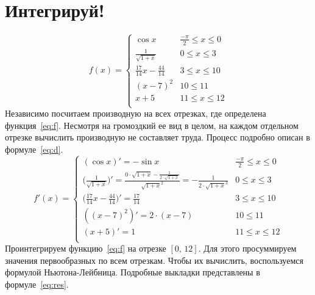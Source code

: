 \documentclass[30pt]{article}
\begin{document}
    \section{Интегрируй!}
        \begin{equation}
            f(x) = \begin{cases}
                \cos{x} & \frac{-\pi}{2} \leqslant x \leqslant 0 \\
                \frac{1}{\sqrt{1 + x}} & 0 \leqslant x \leqslant 3 \\
                \frac{17}{14}x - \frac{44}{14} & 3 \leqslant x \leqslant 10 \\
                (x - 7)^2 & 10 \leqslant  11 \\
                x + 5 & 11 \leqslant x \leqslant 12 \\
            \end{cases}
            \label{eq:f}
        \end{equation}
        Независимо посчитаем производную на всех отрезках, где определена функция~\eqref{eq:f}. Несмотря на громоздкий ее вид в целом, на каждом отдельном отрезке вычислить производную не составляет труда. Процесс подробно описан в формуле~\eqref{eq:d}.
        \begin{equation}
            f'(x) = \begin{cases}
                (\cos{x})' = -\sin{x} & \frac{-\pi}{2} \leqslant x \leqslant 0 \\
                \bigl(\frac{1}{\sqrt{1 + x}}\bigr)' = \frac{0 \cdot \sqrt{1 + x} - \frac{1}{2 \cdot \sqrt{1 + x}}}{\sqrt{1 + x}^2} = -\frac{1}{2 \cdot \sqrt{1 + x}^3} & 0 \leqslant x \leqslant 3 \\
                \bigl(\frac{17}{14}x - \frac{44}{14}\bigr)' = \frac{17}{14} & 3 \leqslant x \leqslant 10 \\
                ((x - 7)^2)' = 2 \cdot (x - 7) & 10 \leqslant  11 \\
                (x + 5)' = 1 & 11 \leqslant x \leqslant 12 \\
            \end{cases}
            \label{eq:d}
        \end{equation}
        Проинтегрируем функцию~\eqref{eq:f} на отрезке $[0,\,12]$. Для этого просуммируем значения первообразных по всем отрезкам. Чтобы их вычислить, воспользуемся формулой Ньютона-Лейбница. Подробные выкладки представлены в формуле~\eqref{eq:res}. 
\end{document}
